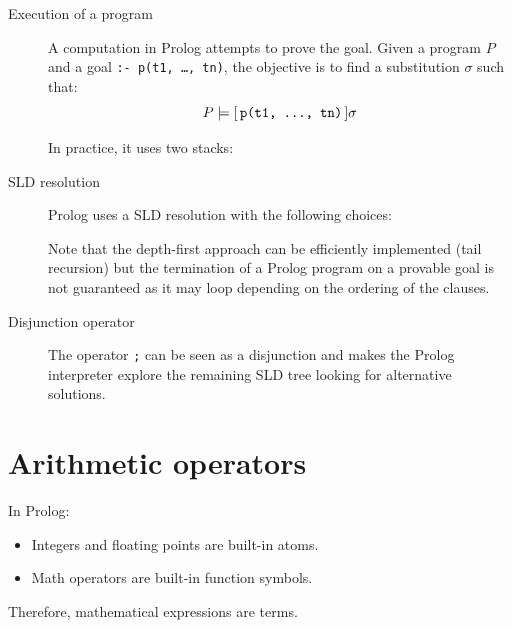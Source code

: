\begin{description}
    \item[Execution of a program]
        A computation in Prolog attempts to prove the goal.
        Given a program $P$ and a goal \texttt{:- p(t1, \dots, tn)},
        the objective is to find a substitution $\sigma$ such that:
        \[ P \models [\, \texttt{p(t1, \dots, tn)} \,]\sigma \]

        In practice, it uses two stacks:

    \item[SLD resolution] 
        Prolog uses a SLD resolution with the following choices:

        Note that the depth-first approach can be efficiently implemented (tail recursion)
        but the termination of a Prolog program on a provable goal is not guaranteed as it may loop depending on the ordering of the clauses.

    \item[Disjunction operator]
        The operator \texttt{;} can be seen as a disjunction and makes the Prolog interpreter
        explore the remaining SLD tree looking for alternative solutions.
\end{description}



\section{Arithmetic operators}

In Prolog:
\begin{itemize}
    \item Integers and floating points are built-in atoms.
    \item Math operators are built-in function symbols.
\end{itemize}
Therefore, mathematical expressions are terms.

